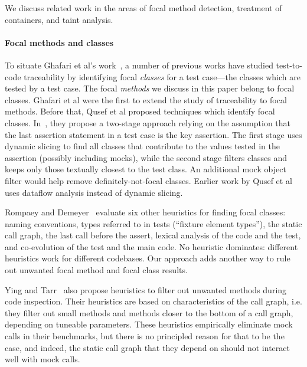 We discuss related work in the areas of focal method detection,
treatment of containers, and taint analysis.

\paragraph{Focal methods and classes} To situate Ghafari et al's work~\cite{ghafari15:_autom}, a number of previous works have studied test-to-code traceability by identifying focal \emph{classes} for a test case---the classes which are tested by a test case. The focal \emph{methods} we discuss in this paper belong to focal classes. Ghafari et al were the first to extend the study of traceability to focal methods. Before that, Qusef et al proposed techniques which identify focal classes. In~\cite{DBLP:conf/icsm/QusefBOLB11}, they propose a two-stage approach relying on the assumption that the last assertion statement in a test case is the key assertion. The first stage uses dynamic slicing to find all classes that contribute to the values tested in the assertion (possibly including mocks), while the second stage filters classes and keeps only those textually closest to the test class. An additional mock object filter would help remove definitely-not-focal classes. Earlier work by Qusef et al~\cite{DBLP:conf/icsm/QusefOL10} uses dataflow analysis instead of dynamic slicing.

Rompaey and Demeyer~\cite{rompaey09:_estab_traceab_links_unit_test} evaluate six other heuristics for finding focal classes: naming conventions, types referred to in tests (``fixture element types''), the static call graph, the last call before the assert, lexical analysis of the code and the test, and co-evolution of the test and the main code. No heuristic dominates: different heuristics work for different codebases. Our approach adds another way to rule out unwanted focal method and focal class results.

Ying and Tarr~\cite{DBLP:conf/eclipse/YingT07} also propose heuristics to filter out unwanted methods during code inspection. Their heuristics are based on characteristics of the call graph, i.e. they filter out small methods and methods closer to the bottom of a call graph, depending on tuneable parameters. These heuristics empirically eliminate mock calls in their benchmarks, but there is no principled reason for that to be the case, and indeed, the static call graph that they depend on should not interact well with mock calls.


